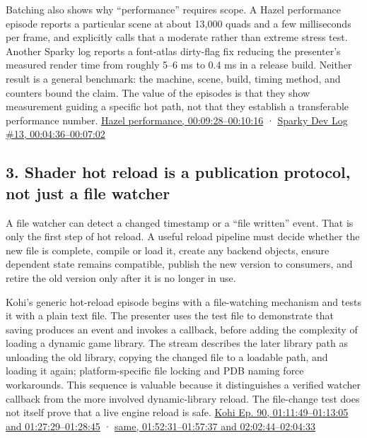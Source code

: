 Batching also shows why ``performance'' requires scope. A Hazel performance episode reports a particular scene at about 13,000 quads and a few milliseconds per frame, and explicitly calls that a moderate rather than extreme stress test. Another Sparky log reports a font-atlas dirty-flag fix reducing the presenter's measured render time from roughly 5--6 ms to 0.4 ms in a release build. Neither result is a general benchmark: the machine, scene, build, timing method, and counters bound the claim. The value of the episodes is that they show measurement guiding a specific hot path, not that they establish a transferable performance number. \href{https://www.youtube.com/watch?v=Yw7RpvmqvSE&t=9m28s}{Hazel performance, 00:09:28--00:10:16} · \href{https://www.youtube.com/watch?v=njTgcayfhJU&t=4m36s}{Sparky Dev Log \#13, 00:04:36--00:07:02}

\subsection{3. Shader hot reload is a publication protocol, not just a file watcher}\label{06-engine-ii-ch041-shader-hot-reload-is-a-publication-protocol-not-just-a-file-watcher}

A file watcher can detect a changed timestamp or a ``file written'' event. That is only the first step of hot reload. A useful reload pipeline must decide whether the new file is complete, compile or load it, create any backend objects, ensure dependent state remains compatible, publish the new version to consumers, and retire the old version only after it is no longer in use.

Kohi's generic hot-reload episode begins with a file-watching mechanism and tests it with a plain text file. The presenter uses the test file to demonstrate that saving produces an event and invokes a callback, before adding the complexity of loading a dynamic game library. The stream describes the later library path as unloading the old library, copying the changed file to a loadable path, and loading it again; platform-specific file locking and PDB naming force workarounds. This sequence is valuable because it distinguishes a verified watcher callback from the more involved dynamic-library reload. The file-change test does not itself prove that a live engine reload is safe. \href{https://www.youtube.com/watch?v=SBG-qrT8wmg&t=1h11m49s}{Kohi Ep. 90, 01:11:49--01:13:05 and 01:27:29--01:28:45} · \href{https://www.youtube.com/watch?v=SBG-qrT8wmg&t=1h52m31s}{same, 01:52:31--01:57:37 and 02:02:44--02:04:33}

